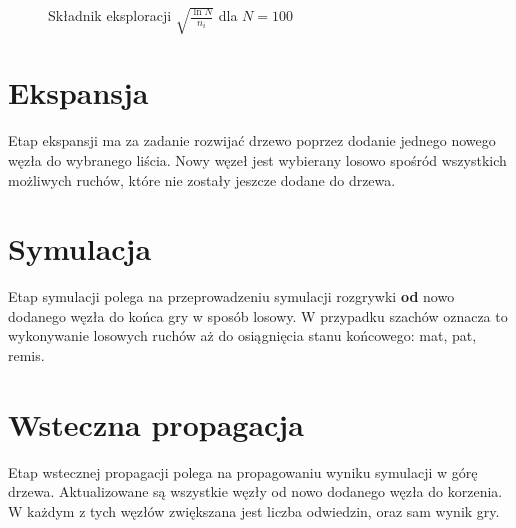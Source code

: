 \begin{figure}[!t]
\centering
{}
\caption{Składnik eksploracji $\sqrt{\frac{\ln N}{n_i}}$ dla $N=100$}
\label{fig:uct-exploration}
\end{figure}

\section{Ekspansja}
Etap ekspansji ma za zadanie rozwijać drzewo poprzez dodanie jednego nowego węzła do wybranego liścia. Nowy węzeł jest wybierany losowo spośród wszystkich możliwych ruchów, które nie zostały jeszcze dodane do drzewa.

\section{Symulacja}
Etap symulacji polega na przeprowadzeniu symulacji rozgrywki \textbf{od} nowo dodanego węzła do końca gry w sposób losowy. W przypadku szachów oznacza to wykonywanie losowych ruchów aż do osiągnięcia stanu końcowego: mat, pat, remis.

\section{Wsteczna propagacja}
Etap wstecznej propagacji polega na propagowaniu wyniku symulacji w górę drzewa. Aktualizowane są wszystkie węzły od nowo dodanego węzła do korzenia. W każdym z tych węzłów zwiększana jest liczba odwiedzin, oraz sam wynik gry.

